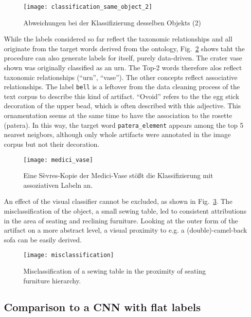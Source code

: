 \begin{figure}
	\centering
	\texttt{[image: classification\_same\_object\_2]}
	\caption{Abweichungen bei der Klassifizierung desselben Objekts (2)}
	\label{fig:classification_same_object_2}
\end{figure}


While the labels considered so far reflect the taxonomic relationships and all originate from the target words derived from the ontology, Fig.~\ref{fig:medici_vase} shows taht the procedure can also generate labels for itself, purely data-driven. The crater vase shown was originally classified as an urn. The Top-2 words therefore alos reflect taxonomic relationships (\enquote{urn}, \enquote{vase}). The other concepts reflect associative relationships. The label \texttt{bell} is a leftover from the data cleaning process of the text corpus to describe this kind of artifact. \enquote{Ovoid} refers to the the egg stick decoration of the upper bead, which is often described with this adjective. This ornamentation seems at the same time to have the association to the rosette (patera). In this way, the target word \texttt{patera\_element} appears among the top 5 nearest neigbors, although only whole artifacts were annotated in the image corpus but not their decoration.


\begin{figure}
	\centering
	\texttt{[image: medici\_vase]}
	\caption{Eine Sèvres-Kopie der Medici-Vase stößt die Klassifizierung mit assoziativen Labeln an.}
	\label{fig:medici_vase}
\end{figure}


An effect of the visual classifier cannot be excluded, as shown in Fig.~\ref{fig:misclassification}. The misclassification of the object, a small sewing table, led to consistent attributions in the area of seating and reclining furniture. Looking at the outer form of the artifact on a more abstract level, a visual proximity to e.g. a (double)-camel-back sofa can be easily derived.


\begin{figure}
	\centering
	\texttt{[image: misclassification]}
	\caption{Misclassification of a sewing table in the proximity of seating furniture hierarchy.}
	\label{fig:misclassification}
\end{figure}


\subsection{Comparison to a CNN with flat labels}

